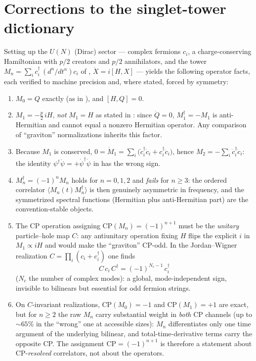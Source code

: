 \documentclass[11pt]{article}
\begin{document}
\section{Corrections to the singlet-tower dictionary}

Setting up the $U(N)$ (Dirac) sector --- complex fermions $c_i$, a
charge-conserving Hamiltonian with $p/2$ creators and $p/2$ annihilators, and
the tower $M_n=\sum_i c_i^\dagger\,(d^n\!/dt^n)c_i$ of \cite{MSS2607},
$\dot X=i[H,X]$ --- yields the following operator facts, each verified to
machine precision and, where stated, forced by symmetry:

\begin{enumerate}
\item $M_0=Q$ exactly (as in \cite{MSS2607}), and $[H,Q]=0$.
\item $M_1=-\tfrac{p}{2}\,iH$, \emph{not} $M_1=H$ as stated in
\cite{MSS2607}: since $\dot Q=0$, $M_1^\dagger=-M_1$ is anti-Hermitian and
cannot equal a nonzero Hermitian operator. Any comparison of ``graviton''
normalizations inherits this factor.
\item Because $M_1$ is conserved,
$0=\dot M_1=\sum_i\bigl(\dot c_i^\dagger\dot c_i+c_i^\dagger\ddot c_i\bigr)$,
hence $M_2=-\sum_i\dot c_i^\dagger\dot c_i$: the identity
$\psi^\dagger\ddot\psi=+\dot\psi^\dagger\dot\psi$ in \cite{MSS2607} has the
wrong sign.
\item $M_n^\dagger=(-1)^nM_n$ holds for $n=0,1,2$ and \emph{fails} for
$n\ge3$: the ordered correlator $\langle M_n(t)M_n^\dagger\rangle$ is then
genuinely asymmetric in frequency, and the symmetrized spectral functions
(Hermitian plus anti-Hermitian part) are the convention-stable objects.
\item The CP operation assigning $\mathrm{CP}(M_n)=(-1)^{n+1}$ must be the
\emph{unitary} particle--hole map $C$: any antiunitary operation fixing $H$
flips the explicit $i$ in $M_1\propto iH$ and would make the ``graviton''
CP-odd. In the Jordan--Wigner realization
$C=\prod_i(c_i+c_i^\dagger)$ one finds
\[
C\,c_i\,C^\dagger=(-1)^{N_c-1}\,c_i^\dagger
\]
($N_c$ the number of complex modes): a global, mode-independent sign,
invisible to bilinears but essential for odd fermion strings.
\item On $C$-invariant realizations, $\mathrm{CP}(M_0)=-1$ and
$\mathrm{CP}(M_1)=+1$ are exact, but for $n\ge2$ the raw $M_n$ carry
substantial weight in \emph{both} CP channels (up to $\sim\!65\%$ in the
``wrong'' one at accessible sizes): $M_n$ differentiates only one time
argument of the underlying bilinear, and total-time-derivative terms carry the
opposite CP. The assignment $\mathrm{CP}=(-1)^{n+1}$ is therefore a statement
about CP-\emph{resolved} correlators, not about the operators.
\end{enumerate}
\end{document}
